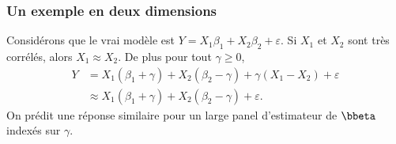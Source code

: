 \documentclass{beamer}\usepackage[]{graphicx}\usepackage[]{color}
\begin{document}
\begin{frame}
  \frametitle{Un exemple en deux dimensions}

  Considérons que le vrai modèle est  $Y = X_1 \beta_1 + X_2\beta_2
  +  \varepsilon$. Si $X_1$ et   $X_2$ sont très corrélés, alors
  $X_1\approx X_2$. De plus pour tout $\gamma\geq 0$,
  \begin{align*}
    Y & = X_1 (\beta_1 + \gamma) + X_2 (\beta_2 - \gamma) +
    \gamma(X_1-X_2) + \varepsilon \\
    & \approx X_1 (\beta_1 + \gamma) + X_2 (\beta_2 - \gamma) + \varepsilon.
  \end{align*}
  On prédit une réponse similaire pour un large panel d'estimateur de  $\bbeta$ indexés sur  $\gamma$.

  \vfill


 \vfill


\end{frame}
\end{document}
